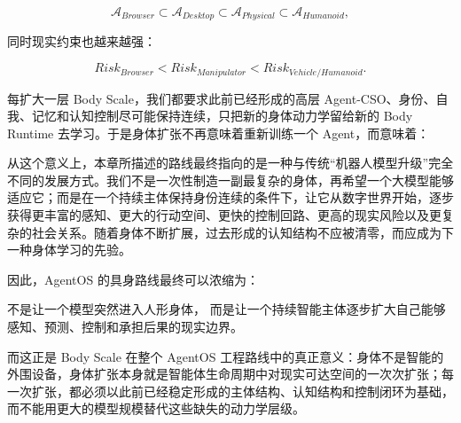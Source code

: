 $$
\mathcal A_{Browser}
\subset
\mathcal A_{Desktop}
\subset
\mathcal A_{Physical}
\subset
\mathcal A_{Humanoid},
$$

同时现实约束也越来越强：

$$
Risk_{Browser}
<
Risk_{Manipulator}
<
Risk_{Vehicle/Humanoid}.
$$

每扩大一层 Body Scale，我们都要求此前已经形成的高层 Agent-CSO、身份、自我、记忆和认知控制尽可能保持连续，只把新的身体动力学留给新的 Body Runtime 去学习。于是身体扩张不再意味着重新训练一个 Agent，而意味着：

\begin{statementbox}
\centering
{}
\end{statementbox}

从这个意义上，本章所描述的路线最终指向的是一种与传统“机器人模型升级”完全不同的发展方式。我们不是一次性制造一副最复杂的身体，再希望一个大模型能够适应它；而是在一个持续主体保持身份连续的条件下，让它从数字世界开始，逐步获得更丰富的感知、更大的行动空间、更快的控制回路、更高的现实风险以及更复杂的社会关系。随着身体不断扩展，过去形成的认知结构不应被清零，而应成为下一种身体学习的先验。

因此，AgentOS 的具身路线最终可以浓缩为：

\begin{conclusion}
不是让一个模型突然进入人形身体，
而是让一个持续智能主体逐步扩大自己能够感知、预测、控制和承担后果的现实边界。
\end{conclusion}

而这正是 Body Scale 在整个 AgentOS 工程路线中的真正意义：身体不是智能的外围设备，身体扩张本身就是智能体生命周期中对现实可达空间的一次次扩张；每一次扩张，都必须以此前已经稳定形成的主体结构、认知结构和控制闭环为基础，而不能用更大的模型规模替代这些缺失的动力学层级。
